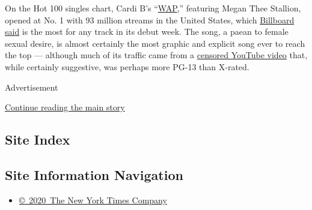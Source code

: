 On the Hot 100 singles chart, Cardi B's
``\href{https://www.nytimes3xbfgragh.onion/2020/08/07/arts/music/playlist-cardi-b-megan-thee-stallion.html}{WAP},''
featuring Megan Thee Stallion, opened at No. 1 with 93 million streams
in the United States, which
\href{https://www.billboard.com/articles/business/chart-beat/9435213/cardi-bs-wap-debuts-no-1-hot-100}{Billboard
said} is the most for any track in its debut week. The song, a paean to
female sexual desire, is almost certainly the most graphic and explicit
song ever to reach the top --- although much of its traffic came from a
\href{https://www.youtube.com/watch?time_continue=28\&v=hsm4poTWjMs\&feature=emb_logo}{censored
YouTube video} that, while certainly suggestive, was perhaps more PG-13
than X-rated.

Advertisement

\protect\hyperlink{after-bottom}{Continue reading the main story}

\hypertarget{site-index}{%
\subsection{Site Index}\label{site-index}}

\hypertarget{site-information-navigation}{%
\subsection{Site Information
Navigation}\label{site-information-navigation}}

\begin{itemize}
\tightlist
\item
  \href{https://help.nytimes3xbfgragh.onion/hc/en-us/articles/115014792127-Copyright-notice}{©~2020~The
  New York Times Company}
\end{itemize}

